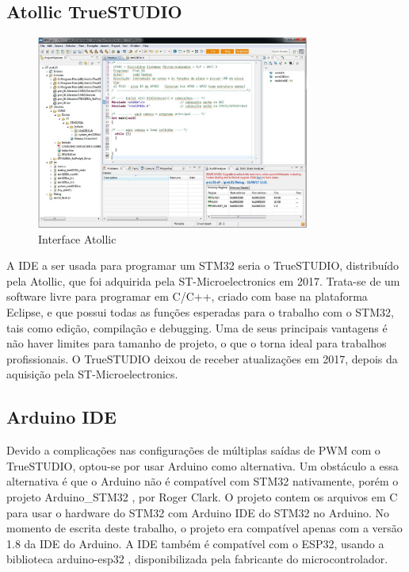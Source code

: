 \subsection{Atollic TrueSTUDIO}

\begin{figure}[ht]
	\centering
	\includegraphics[width=0.8\textwidth]{figures/atollic}
	\caption{Interface Atollic \cite{apostila_microprossados}}
\end{figure}

A IDE a ser usada para programar um STM32 seria o TrueSTUDIO, distribuído pela
Atollic, que foi adquirida pela ST-Microelectronics em 2017. Trata-se de um
software livre para programar em C/C++, criado com base na plataforma Eclipse,
e que possui todas as funções esperadas para o trabalho com o STM32, tais como
edição, compilação e debugging. Uma de seus principais vantagens é não haver
limites para tamanho de projeto, o que o torna ideal para trabalhos
profissionais. O TrueSTUDIO deixou de receber atualizações em 2017,
depois da aquisição pela ST-Microelectronics.\cite{apostila_microprossados}



\subsection{Arduino IDE}

Devido a complicações nas configurações de múltiplas saídas de PWM com o
TrueSTUDIO, optou-se por usar Arduino como alternativa. Um obstáculo a essa
alternativa é que o Arduino não é compatível com STM32 nativamente,
porém o projeto Arduino\_STM32 \cite{arduino_stm32}, por Roger Clark.
O projeto contem os arquivos em C para usar o hardware do STM32 com Arduino IDE
do STM32 no Arduino. No momento de escrita deste trabalho, o projeto era
compatível apenas com a versão 1.8 da IDE do Arduino.
A IDE também é compatível com o ESP32,  usando a biblioteca arduino-esp32 \cite{arduino_esp32}, 
disponibilizada pela fabricante do microcontrolador.



